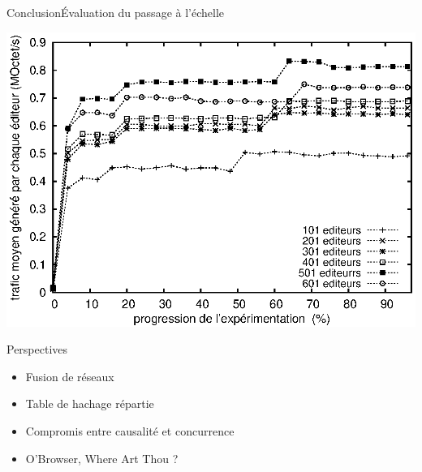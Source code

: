\begin{frame}{Conclusion}{Évaluation du passage à l'échelle}

  \begin{center}
    \includegraphics[width=1\textwidth]{img/editor/communication.eps}
  \end{center}

\end{frame}


\begin{frame}{Perspectives}

  \begin{itemize}   
  \item Fusion de réseaux
  \item Table de hachage répartie
  \item Compromis entre causalité et concurrence
  \item O'Browser, Where Art Thou ?
  \end{itemize}

\end{frame}

